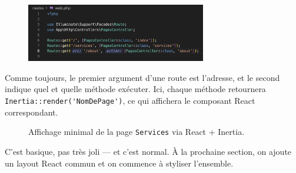\begin{figure}[H]
    \centering
    \includegraphics[width=0.7\textwidth]{figures-C1/routes_ini.png}
    \caption{}
\end{figure}

Comme toujours, le premier argument d’une route est l’adresse, et le second indique quel \controller{} et quelle méthode exécuter.  
Ici, chaque méthode retournera \verb|Inertia::render('NomDePage')|, ce qui affichera le composant React correspondant.

\begin{figure}[H]
    \centering
    \caption{Affichage minimal de la page \texttt{Services} via React + Inertia.}
\end{figure}

C’est basique, pas très joli — et c’est normal. À la prochaine section, on ajoute un layout React commun et on commence à styliser l’ensemble.
